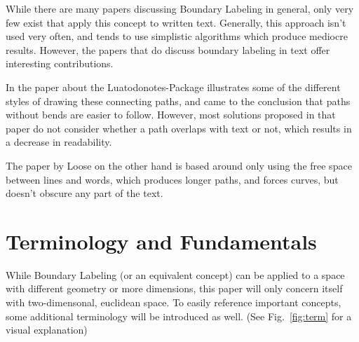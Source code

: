 \documentclass[11pt,a4paper]{vutinfth}
\begin{document}
While there are many papers discussing Boundary Labeling in general, only very few exist that apply this concept to written text. Generally, this approach isn't used very often, and tends to use simplistic algorithms which produce mediocre results. %
However, the papers that do discuss boundary labeling in text offer interesting contributions.

In the paper about the Luatodonotes-Package\cite{Kindermann2014} illustrates some of the different styles of drawing these connecting paths, and came to the conclusion that paths without bends are easier to follow. %
However, most solutions proposed in that paper do not consider whether a path overlaps with text or not, which results in a decrease in readability.

The paper by Loose\cite{Loose2015} on the other hand is based around only using the free space between lines and words, which produces longer paths, and forces curves, but doesn't obscure any part of the text.



\section{Terminology and Fundamentals} %
While Boundary Labeling (or an equivalent concept) can be applied to a space with different geometry or more dimensions, this paper will only concern itself with two-dimensonal, euclidean space.
To easily reference important concepts, some additional terminology will be introduced as well. (See Fig.~\ref{fig:term} for a visual explanation)%

\end{document}
